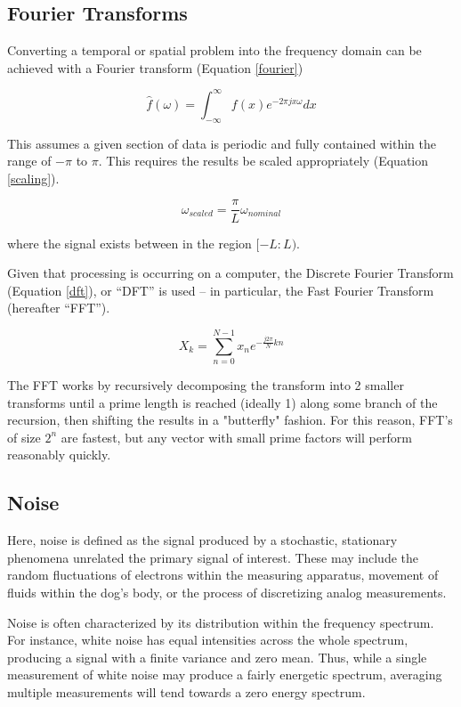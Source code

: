 \documentclass[journal]{IEEEtran}
\begin{document}
\subsection{Fourier Transforms}
Converting a temporal or spatial problem into the frequency domain can be achieved with a Fourier transform (Equation \ref{fourier})

\begin{equation}
\label{fourier}
\hat{f}(\omega)=\int_{-\infty}^{\infty}f(x)e^{-2 \pi jx \omega}dx
\end{equation}

This assumes a given section of data is periodic and fully contained within the range of $-\pi$ to $\pi$. This requires the results be scaled appropriately (Equation \ref{scaling}).

\begin{equation}
\label{scaling}
\omega_{scaled}=\frac{\pi}{L}\omega_{nominal}
\end{equation}

\noindent where the signal exists between in the region $[-L:L)$.

Given that processing is occurring on a computer, the Discrete Fourier Transform (Equation \ref{dft}), or ``DFT'' is used -- in particular, the Fast Fourier Transform (hereafter ``FFT'').

\begin{equation}
\label{dft}
X_{k}=\sum_{n=0}^{N-1}x_{n}e^{-\frac{j2\pi}{N}kn}
\end{equation}

The FFT works by recursively decomposing the transform into 2 smaller transforms until a prime length is reached (ideally 1) along some branch of the recursion, then shifting the results in a "butterfly" fashion. For this reason, FFT's of size $2^n$ are fastest, but any vector with small prime factors will perform reasonably quickly.

\subsection{Noise}
Here, noise is defined as the signal produced by a stochastic, stationary phenomena unrelated the primary signal of interest. These may include the random fluctuations of electrons within the measuring apparatus, movement of fluids within the dog's body, or the process of discretizing analog measurements.

Noise is often characterized by its distribution within the frequency spectrum. For instance, white noise has equal intensities across the whole spectrum, producing a signal with a finite variance and zero mean. Thus, while a single measurement of white noise may produce a fairly energetic spectrum, averaging multiple measurements will tend towards a zero energy spectrum.
\end{document}
